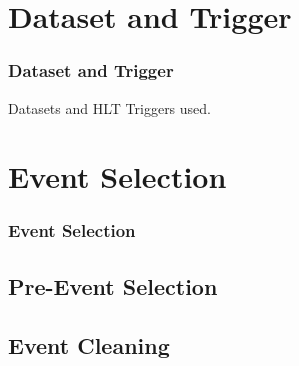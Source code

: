 \documentclass{beamer}
\begin{document}
\section{Dataset and Trigger}
\begin{frame}
\frametitle{\Huge Dataset and Trigger}
Datasets and HLT Triggers used.
\end{frame}
\section{Event Selection}
\begin{frame}
\frametitle{\Huge Event Selection}
\subsection{Pre-Event Selection}
\subsection{Event Cleaning}

\end{frame}
\end{document}

